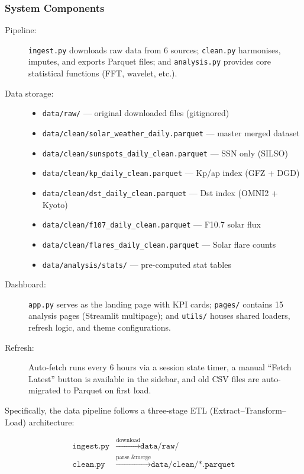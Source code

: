 \subsubsection*{System Components}
\begin{description}
    \item[Pipeline:] \texttt{ingest.py} downloads raw data from 6 sources; \texttt{clean.py} harmonises, imputes, and exports Parquet files; and \texttt{analysis.py} provides core statistical functions (FFT, wavelet, etc.).
    \item[Data storage:] 
    \begin{itemize}
        \item \texttt{data/raw/} --- original downloaded files (gitignored)
        \item \texttt{data/clean/solar\_weather\_daily.parquet} --- master merged dataset
        \item \texttt{data/clean/sunspots\_daily\_clean.parquet} --- SSN only (SILSO)
        \item \texttt{data/clean/kp\_daily\_clean.parquet} --- Kp/ap index (GFZ + DGD)
        \item \texttt{data/clean/dst\_daily\_clean.parquet} --- Dst index (OMNI2 + Kyoto)
        \item \texttt{data/clean/f107\_daily\_clean.parquet} --- F10.7 solar flux
        \item \texttt{data/clean/flares\_daily\_clean.parquet} --- Solar flare counts
        \item \texttt{data/analysis/stats/} --- pre-computed stat tables
    \end{itemize}
    \item[Dashboard:] \texttt{app.py} serves as the landing page with KPI cards; \texttt{pages/} contains 15 analysis pages (Streamlit multipage); and \texttt{utils/} houses shared loaders, refresh logic, and theme configurations.
    \item[Refresh:] Auto-fetch runs every 6 hours via a session state timer, a manual ``Fetch Latest'' button is available in the sidebar, and old CSV files are auto-migrated to Parquet on first load.
\end{description}

Specifically, the data pipeline follows a three-stage ETL (Extract--Transform--Load) architecture:

\begin{align}
    \texttt{ingest.py} &\xrightarrow{\text{download}} \texttt{data/raw/} \label{eq:ingest} \\
    \texttt{clean.py}  &\xrightarrow{\text{parse \& merge}} \texttt{data/clean/*.parquet} \label{eq:clean}
\end{align}

